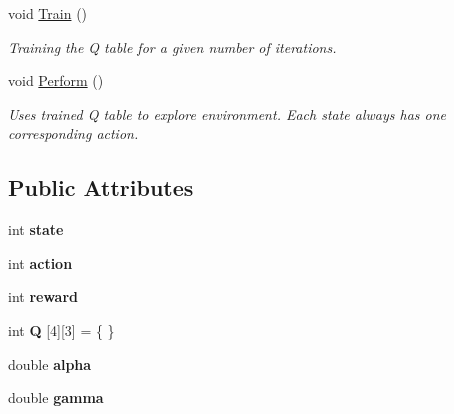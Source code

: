 \begin{DoxyCompactItemize}
void \hyperlink{classQtable_ae95e794c436eaa981a6f949ceb41987a}{Train} ()
\begin{DoxyCompactList}\small\item\em Training the Q table for a given number of iterations. \end{DoxyCompactList}\item 
void \hyperlink{classQtable_ad4f04eb93ca6fbdaf0b19604c68b0071}{Perform} ()
\begin{DoxyCompactList}\small\item\em Uses trained Q table to explore environment. Each state always has one corresponding action. \end{DoxyCompactList}\end{DoxyCompactItemize}
\subsection*{Public Attributes}
\begin{DoxyCompactItemize}
\item 
\hypertarget{classQtable_ab465d331ceb5e9cfee2cb7d1e8c809fe}{int {\bfseries state}}\label{classQtable_ab465d331ceb5e9cfee2cb7d1e8c809fe}

\item 
\hypertarget{classQtable_a312195a50887e63e8f25f7846b208fbc}{int {\bfseries action}}\label{classQtable_a312195a50887e63e8f25f7846b208fbc}

\item 
\hypertarget{classQtable_a4b6c0b62bcdacf6b078e235452275e0b}{int {\bfseries reward}}\label{classQtable_a4b6c0b62bcdacf6b078e235452275e0b}

\item 
\hypertarget{classQtable_a6d7d6f9fa857dc4c4c77649ea5380e04}{int {\bfseries Q} \mbox{[}4\mbox{]}\mbox{[}3\mbox{]} = \{ \}}\label{classQtable_a6d7d6f9fa857dc4c4c77649ea5380e04}

\item 
\hypertarget{classQtable_a89e7ef35e39ba6216e31fd2982146196}{double {\bfseries alpha}}\label{classQtable_a89e7ef35e39ba6216e31fd2982146196}

\item 
\hypertarget{classQtable_a273daf86073f850fab22ee6ee94c29b6}{double {\bfseries gamma}}\label{classQtable_a273daf86073f850fab22ee6ee94c29b6}

\end{DoxyCompactItemize}


